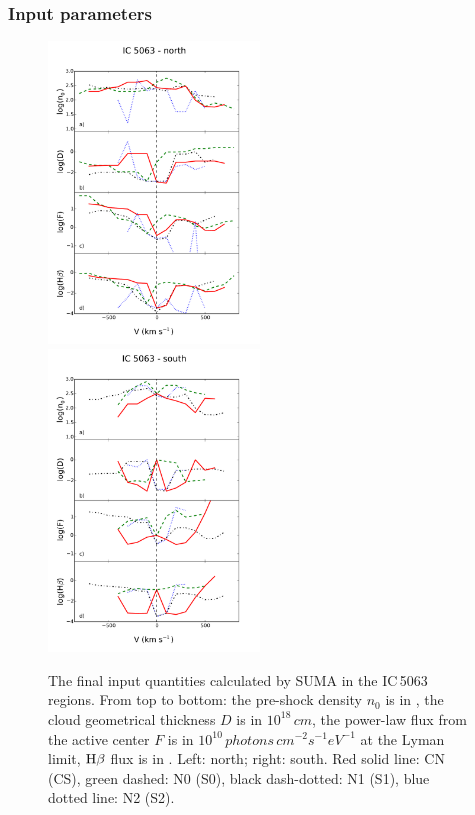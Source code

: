 \documentclass[../main.tex]{subfiles}
\begin{document}
\subsubsection{Input parameters}
\label{sec:input_param}

\begin{figure}
\includegraphics[width=0.5\textwidth]{images/paper1/icn.pdf}
\includegraphics[width=0.5\textwidth]{images/paper1/ics.pdf}
\caption{The final input quantities calculated by SUMA in the IC\,5063 regions. From top to bottom: the pre-shock density $n_0$ is in , the cloud geometrical thickness $D$ is in $10^{18}\,\si{cm}$, the power-law flux from the active center $F$ is in $10^{10}\,\si{photons\,cm^{-2} s^{-1} eV^{-1}}$ at the Lyman limit, $\rm H\beta$ flux is in \erg. Left: north; right: south. Red solid line: CN (CS), green dashed: N0 (S0), black dash-dotted: N1 (S1), blue dotted line: N2 (S2).}
\label{fig:IC_m}
\end{figure}
\end{document}
